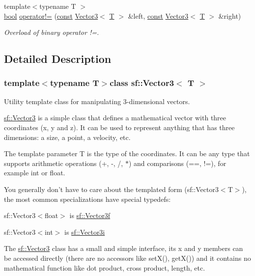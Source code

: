 \begin{DoxyCompactItemize}
{\footnotesize template$<$typename T $>$ }\\\hyperlink{term__entry_8h_a002004ba5d663f149f6c38064926abac}{bool} \hyperlink{classsf_1_1_vector3_a608500d1ad3b78082cb5bb4356742bd4}{operator!=} (\hyperlink{term__entry_8h_a57bd63ce7f9a353488880e3de6692d5a}{const} \hyperlink{classsf_1_1_vector3}{Vector3}$<$ \hyperlink{curses_8priv_8h_a5ef253115820acf7d27f3c5c3b02a0f0}{T} $>$ \&left, \hyperlink{term__entry_8h_a57bd63ce7f9a353488880e3de6692d5a}{const} \hyperlink{classsf_1_1_vector3}{Vector3}$<$ \hyperlink{curses_8priv_8h_a5ef253115820acf7d27f3c5c3b02a0f0}{T} $>$ \&right)
\begin{DoxyCompactList}\small\item\em Overload of binary operator !=. \end{DoxyCompactList}\end{DoxyCompactItemize}


\subsection{Detailed Description}
\subsubsection*{template$<$typename T$>$class sf\-::\-Vector3$<$ T $>$}

Utility template class for manipulating 3-\/dimensional vectors. 

\hyperlink{classsf_1_1_vector3}{sf\-::\-Vector3} is a simple class that defines a mathematical vector with three coordinates (x, y and z). It can be used to represent anything that has three dimensions\-: a size, a point, a velocity, etc.

The template parameter T is the type of the coordinates. It can be any type that supports arithmetic operations (+, -\/, /, $\ast$) and comparisons (==, !=), for example int or float.

You generally don't have to care about the templated form (sf\-::\-Vector3$<$\-T$>$), the most common specializations have special typedefs\-: \begin{DoxyItemize}
\item sf\-::\-Vector3$<$float$>$ is \hyperlink{namespacesf_a36e44d9e6d8f649703698ec9d24ac052}{sf\-::\-Vector3f} \item sf\-::\-Vector3$<$int$>$ is \hyperlink{namespacesf_ae33ba51125c097a0aa1b32e20b6e96cd}{sf\-::\-Vector3i}\end{DoxyItemize}
The \hyperlink{classsf_1_1_vector3}{sf\-::\-Vector3} class has a small and simple interface, its x and y members can be accessed directly (there are no accessors like set\-X(), get\-X()) and it contains no mathematical function like dot product, cross product, length, etc.

